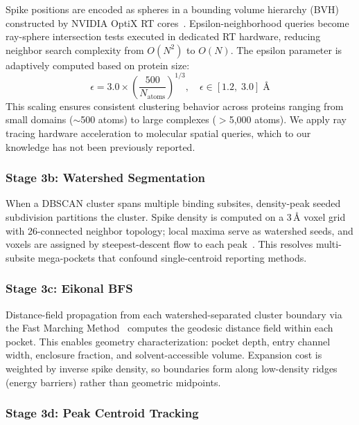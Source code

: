 \documentclass{sn-jnl}
\begin{document}
Spike positions are encoded as spheres in a bounding volume hierarchy (BVH) constructed by
NVIDIA OptiX RT cores~\cite{parker2010}. Epsilon-neighborhood queries become ray-sphere
intersection tests executed in dedicated RT hardware, reducing neighbor search complexity
from $O(N^2)$ to $O(N)$. The epsilon parameter is adaptively computed based on protein
size:
\begin{equation}
  \epsilon = 3.0 \times \left(\frac{500}{N_{\text{atoms}}}\right)^{1/3}, \quad
  \epsilon \in [1.2, \; 3.0] \; \text{\AA}
  \label{eq:adaptive_eps}
\end{equation}
This scaling ensures consistent clustering behavior across proteins ranging from small
domains ($\sim$500 atoms) to large complexes ($>$5{,}000 atoms). We apply ray tracing
hardware acceleration to molecular spatial queries, which to our knowledge has not been
previously reported.

\subsubsection{Stage 3b: Watershed Segmentation}

When a DBSCAN cluster spans multiple binding subsites, density-peak seeded subdivision
partitions the cluster. Spike density is computed on a 3\,\AA{} voxel grid with 26-connected
neighbor topology; local maxima serve as watershed seeds, and voxels are assigned by
steepest-descent flow to each peak~\cite{vincent1991}. This resolves multi-subsite
mega-pockets that confound single-centroid reporting methods.

\subsubsection{Stage 3c: Eikonal BFS}

Distance-field propagation from each watershed-separated cluster boundary via the Fast
Marching Method~\cite{sethian1996} computes the geodesic distance field within each pocket.
This enables geometry characterization: pocket depth, entry channel width, enclosure
fraction, and solvent-accessible volume. Expansion cost is weighted by inverse spike density,
so boundaries form along low-density ridges (energy barriers) rather than geometric
midpoints.

\subsubsection{Stage 3d: Peak Centroid Tracking}
\end{document}
